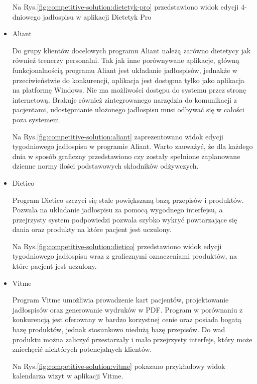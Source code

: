 \begin{itemize}
        Na Rys.\ref{fig:competitive-solution:dietetyk-pro} przedstawiono widok edycji 4-dniowego jadłospisu w aplikacji Dietetyk Pro

    \item Aliant\cite{url:aliant}

        Do grupy klientów docelowych programu Aliant należą zarówno dietetycy jak również trenerzy personalni.
        Tak jak inne porównywane aplikacje, główną funkcjonalnością programu Aliant jest układanie jadłospisów,
        jednakże w przeciwieństwie do konkurencji, aplikacja jest dostępna tylko jako aplikacja na platformę Windows.
        Nie ma możliwości dostępu do systemu przez stronę internetową.
        Brakuje również zintegrowanego narzędzia do komunikacji z pacjentami, udostępnianie ułożonego jadłospisu musi odbywać się w całości poza systemem.

        Na Rys.\ref{fig:competitive-solution:aliant} zaprezentowano widok edycji tygodniowego jadłospisu w programie Aliant.
        Warto zauważyć, że dla każdego dnia w sposób graficzny przedstawiono czy zostały spełnione zaplanowane dzienne normy ilości podstawowych składników odżywczych.

    \item Dietico\cite{url:dietico}

        Program Dietico szczyci się stale powiększaną bazą przepisów i produktów.
        Pozwala na układanie jadłospisu za pomocą wygodnego interfejsu, a przejrzysty system podpowiedzi pozwala szybko wykryć powtarzające się dania oraz produkty na które pacjent jest uczulony.

        Na Rys.\ref{fig:competitive-solution:dietico} przedstawiono widok edycji tygodniowego jadłospisu wraz z graficznymi oznaczeniami produktów, na które pacjent jest uczulony.

    \item Vitme\cite{url:vitme}

        Program Vitme umożliwia prowadzenie kart pacjentów, projektowanie jadłospisów oraz generowanie wydruków w PDF.
        Program w porównaniu z konkurencją jest oferowany w bardzo korzystnej cenie oraz posiada bogatą bazę produktów, jednak stosunkowo niedużą bazę przepisów.
        Do wad produktu można zaliczyć przestarzały i mało przejrzysty interfejs, który może zniechęcić niektórych potencjalnych klientów.

        Na Rys.\ref{fig:competitive-solution:vitme} pokazano przykładowy widok kalendarza wizyt w aplikacji Vitme.

\end{itemize}

